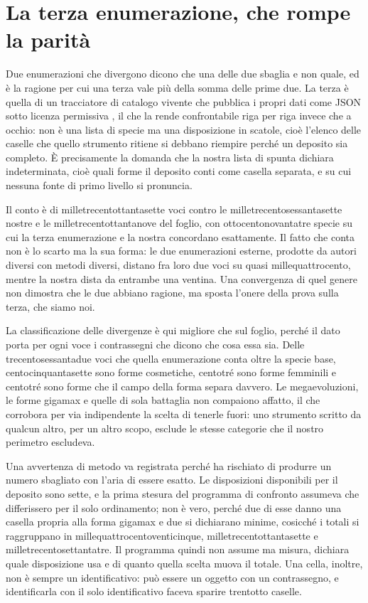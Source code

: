 \section{La terza enumerazione, che rompe la parità}

Due enumerazioni che divergono dicono che una delle due sbaglia e non quale, ed è la ragione per cui una terza vale più della somma delle prime due. La terza è quella di un tracciatore di catalogo vivente che pubblica i propri dati come JSON sotto licenza permissiva \cite{pokepc-dati}, il che la rende confrontabile riga per riga invece che a occhio: non è una lista di specie ma una disposizione in scatole, cioè l'elenco delle caselle che quello strumento ritiene si debbano riempire perché un deposito sia completo. È precisamente la domanda che la nostra lista di spunta dichiara indeterminata, cioè quali forme il deposito conti come casella separata, e su cui nessuna fonte di primo livello si pronuncia.

Il conto è di milletrecentottantasette voci contro le milletrecentosessantasette nostre e le milletrecentottantanove del foglio, con ottocentonovantatre specie su cui la terza enumerazione e la nostra concordano esattamente. Il fatto che conta non è lo scarto ma la sua forma: le due enumerazioni esterne, prodotte da autori diversi con metodi diversi, distano fra loro due voci su quasi millequattrocento, mentre la nostra dista da entrambe una ventina. Una convergenza di quel genere non dimostra che le due abbiano ragione, ma sposta l'onere della prova sulla terza, che siamo noi.

La classificazione delle divergenze è qui migliore che sul foglio, perché il dato porta per ogni voce i contrassegni che dicono che cosa essa sia. Delle trecentosessantadue voci che quella enumerazione conta oltre la specie base, centocinquantasette sono forme cosmetiche, centotré sono forme femminili e centotré sono forme che il campo della forma separa davvero. Le megaevoluzioni, le forme gigamax e quelle di sola battaglia non compaiono affatto, il che corrobora per via indipendente la scelta di tenerle fuori: uno strumento scritto da qualcun altro, per un altro scopo, esclude le stesse categorie che il nostro perimetro escludeva.

Una avvertenza di metodo va registrata perché ha rischiato di produrre un numero sbagliato con l'aria di essere esatto. Le disposizioni disponibili per il deposito sono sette, e la prima stesura del programma di confronto assumeva che differissero per il solo ordinamento; non è vero, perché due di esse danno una casella propria alla forma gigamax e due si dichiarano minime, cosicché i totali si raggruppano in millequattrocentoventicinque, milletrecentottantasette e milletrecentosettantatre. Il programma quindi non assume ma misura, dichiara quale disposizione usa e di quanto quella scelta muova il totale. Una cella, inoltre, non è sempre un identificativo: può essere un oggetto con un contrassegno, e identificarla con il solo identificativo faceva sparire trentotto caselle.

